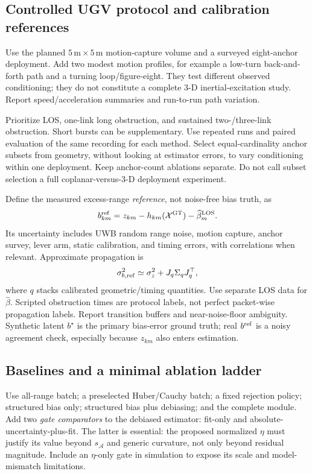 \documentclass[conference]{IEEEtran}%
\newcommand{\X}{\mathcal X}
\newcommand{\A}{\mathcal A}
\begin{document}
\subsection{Controlled UGV protocol and calibration references}
Use the planned $5\,\mathrm m\times5\,\mathrm m$ motion-capture volume and a surveyed eight-anchor deployment. Add two modest motion profiles, for example a low-turn back-and-forth path and a turning loop/figure-eight. They test different observed conditioning; they do not constitute a complete 3-D inertial-excitation study. Report speed/acceleration summaries and run-to-run path variation.

Prioritize LOS, one-link long obstruction, and sustained two-/three-link obstruction. Short bursts can be supplementary. Use repeated runs and paired evaluation of the same recording for each method. Select equal-cardinality anchor subsets from geometry, without looking at estimator errors, to vary conditioning within one deployment. Keep anchor-count ablations separate. Do not call subset selection a full coplanar-versus-3-D deployment experiment.

Define the measured excess-range \emph{reference}, not noise-free bias truth, as
\begin{equation}
 b^{\rm ref}_{km}=z_{km}-h_{km}(\X^{\rm GT})-
                         \widehat\beta_m^{\rm LOS}.
 \label{eq:reference_bias}
\end{equation}
Its uncertainty includes UWB random range noise, motion capture, anchor survey, lever arm, static calibration, and timing errors, with correlations when relevant. Approximate propagation is
\begin{equation}
 \sigma_{b,\rm ref}^2\simeq\sigma_z^2+J_q\Sigma_qJ_q^\top,
 \label{eq:reference_budget}
\end{equation}
where $q$ stacks calibrated geometric/timing quantities. Use separate LOS data for $\widehat\beta$. Scripted obstruction times are protocol labels, not perfect packet-wise propagation labels. Report transition buffers and near-noise-floor ambiguity. Synthetic latent $b^\star$ is the primary bias-error ground truth; real $b^{\rm ref}$ is a noisy agreement check, especially because $z_{km}$ also enters estimation.

\subsection{Baselines and a minimal ablation ladder}
Use all-range batch; a preselected Huber/Cauchy batch; a fixed rejection policy; structured bias only; structured bias plus debiasing; and the complete module. Add two \emph{gate comparators} to the debiased estimator: fit-only and absolute-uncertainty-plus-fit. The latter is essential: the proposed normalized $\eta$ must justify its value beyond $s_\A$ and generic curvature, not only beyond residual magnitude. Include an $\eta$-only gate in simulation to expose its scale and model-mismatch limitations.
\end{document}
